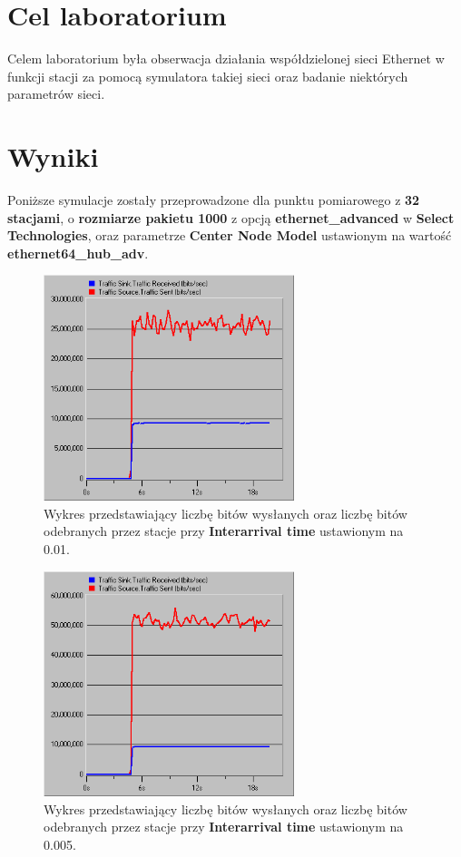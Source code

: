 \documentclass{article}
\begin{document}

\newpage
\section{Cel laboratorium}
Celem laboratorium była obserwacja działania współdzielonej sieci \linebreak Ethernet w funkcji stacji za pomocą symulatora takiej sieci oraz badanie niektórych parametrów sieci.
\section{Wyniki}
Poniższe symulacje zostały przeprowadzone dla punktu pomiarowego z \textbf{32 stacjami}, o \textbf{rozmiarze pakietu 1000} z opcją \textbf{ethernet\_advanced} w \textbf{Select Technologies}, oraz parametrze \textbf{Center Node Model} ustawionym na wartość \textbf{ethernet64\_hub\_adv}.
\begin{figure}[H]
  \centering
  \includegraphics[width=0.65\textwidth]{screens/samo/001_sentrec.png}
 \caption{Wykres przedstawiający liczbę bitów wysłanych oraz liczbę bitów odebranych przez stacje przy \textbf{Interarrival time} ustawionym na 0.01. }
 \label{fig:sentrec001}
\end{figure}
 
\begin{figure}[H]
  \centering
  \includegraphics[width=0.65\textwidth]{screens/samo/0005_sentrec.png}
 \caption{Wykres przedstawiający liczbę bitów wysłanych oraz liczbę bitów odebranych przez stacje przy \textbf{Interarrival time} ustawionym na 0.005. }
 \label{fig:sentrec005}
\end{figure}
\end{document}
